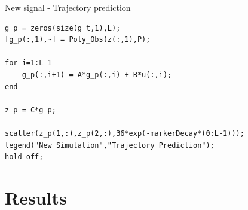 \documentclass{beamer}
\begin{document}
\begin{frame}[fragile]{New signal - Trajectory prediction}
    \begin{lstlisting}
g_p = zeros(size(g_t,1),L);
[g_p(:,1),~] = Poly_Obs(z(:,1),P);

for i=1:L-1
    g_p(:,i+1) = A*g_p(:,i) + B*u(:,i);
end

z_p = C*g_p;

scatter(z_p(1,:),z_p(2,:),36*exp(-markerDecay*(0:L-1)));
legend("New Simulation","Trajectory Prediction");
hold off;
    \end{lstlisting}
\end{frame}


\section{Results}
\end{document}
